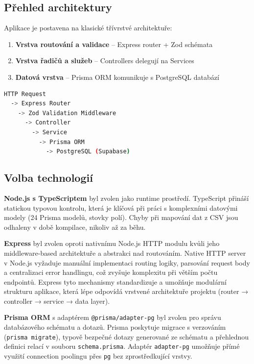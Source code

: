 \documentclass[12pt,a4paper]{article}
\begin{document}
\subsection{Přehled architektury}

Aplikace je postavena na klasické třívrstvé architektuře:

\begin{enumerate}
  \item \textbf{Vrstva routování a validace} -- Express router + Zod schémata
  \item \textbf{Vrstva řadičů a služeb} -- Controllers delegují na Services
  \item \textbf{Datová vrstva} -- Prisma ORM komunikuje s PostgreSQL databází
\end{enumerate}

\begin{lstlisting}[language=bash, caption={Zjednodušený tok požadavku}]
HTTP Request
  -> Express Router
    -> Zod Validation Middleware
      -> Controller
        -> Service
          -> Prisma ORM
            -> PostgreSQL (Supabase)
\end{lstlisting}

\subsection{Volba technologií}

\textbf{Node.js s TypeScriptem} byl zvolen jako runtime prostředí. TypeScript přináší statickou typovou kontrolu, která je klíčová při práci s komplexními datovými modely (24 Prisma modelů, stovky polí). Chyby při mapování dat z CSV jsou odhaleny v době kompilace, nikoliv až za běhu.

\textbf{Express} byl zvolen oproti nativnímu Node.js HTTP modulu kvůli jeho middleware-based architektuře a abstrakci nad routováním. Native HTTP server v Node.js vyžaduje manuální implementaci routing logiky, parsování request body a centralizaci error handlingu, což zvyšuje komplexitu při větším počtu endpointů. Express tyto mechanismy standardizuje a umožňuje modulární strukturu aplikace, která lépe odpovídá vrstvené architektuře projektu (router → controller → service → data layer).

\textbf{Prisma ORM} s adaptérem \texttt{@prisma/adapter-pg} byl zvolen pro správu databázového schématu a dotazů. Prisma poskytuje migrace s verzováním (\texttt{prisma migrate}), typově bezpečné dotazy generované ze schématu a přehlednou definici relací v souboru \texttt{schema.prisma}. Adaptér \texttt{adapter-pg} umožňuje přímé využití connection poolingu přes \texttt{pg} bez zprostředkující vrstvy.
\end{document}
